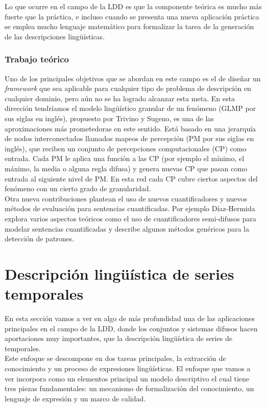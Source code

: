 \documentclass[10pt,a4paper]{article}
\begin{document}
Lo que ocurre en el campo de la LDD es que la componente teórica es mucho más fuerte que la práctica, e incluso cuando se presenta una nueva aplicación práctica se emplea mucho lenguaje matemático para formalizar la tarea de la generación de las descripciones lingüísticas.

\subsubsection{Trabajo teórico}

Uno de los principales objetivos que se abordan en este campo es el de diseñar un \textit{framework} que sea aplicable para cualquier tipo de problema de descripción en cualquier dominio, pero aún no se ha logrado alcanzar esta meta. En esta dirección tendríamos el modelo lingüístico granular de un fenómeno (GLMP por sus siglas en inglés), propuesto por Trivino y Sugeno, es una de las aproximaciones más prometedoras en este sentido. Está basado en una jerarquía de nodos interconectados llamados mapeos de percepción (PM por sus siglas en inglés), que reciben un conjunto de percepciones computacionales (CP) como entrada. Cada PM le aplica una función a las CP (por ejemplo el mínimo, el máximo, la media o alguna regla difusa) y genera nuevas CP que pasan como entrada al siguiente nivel de PM. En esta red cada CP cubre ciertos aspectos del fenómeno con un cierto grado de granularidad.\\

Otra nueva contribuciones plantean el uso de nuevos cuantificadores y nuevos métodos de evaluación para sentencias cuantificadas. Por ejemplo Díaz-Hermida explora varios aspectos teóricos como el uso de cuantificadores semi-difusos para modelar sentencias cuantificadas y describe algunos métodos genéricos para la detección de patrones.

\section{Descripción lingüística de series temporales}

En esta sección vamos a ver en algo de más profundidad una de las aplicaciones principales en el campo de la LDD, donde los conjuntos y sistemas difusos hacen aportaciones muy importantes, que la descripción lingüística de series de temporales.\\

Este enfoque se descompone en dos tareas principales, la extracción de conocimiento y un proceso de expresiones lingüísticas. El enfoque que vamos a ver incorpora como un elementos principal un modelo descriptivo el cual tiene tres piezas fundamentales: un mecanismo de formalización del conocimiento, un lenguaje de expresión y un marco de calidad.\\
\end{document}
